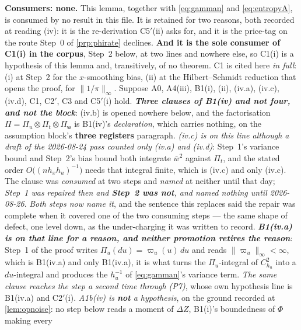 \begin{lemma}\label{lem:aerr}
\textbf{Consumers: none.} This lemma, together with \eqref{eq:gamman} and \eqref{eq:entropyA},
is consumed by no result in this file. It is
retained for two reasons, both recorded at reading (iv): it is the re-derivation C5$'$(ii) asks for,
and it is the price-tag on the route Step~0 of \cref{prp:phirate} declines.
\textbf{And it is the sole consumer of C1(i) in the corpus}, Step~2 below, at two lines and nowhere
else, so C1(i) is a hypothesis of this lemma and, transitively, of no theorem. C1 is
cited here \emph{in full}: (i) at Step~2 for the $x$-smoothing bias, (ii) at the
Hilbert--Schmidt reduction that opens the proof, for $\|1/\pi\|_\infty$.
Suppose A0, A4(iii), B1(i), (ii), (iv.a), (iv.c), (iv.d), C1, C2$'$, C3 and C5$'$(i) hold.
\emph{\textbf{Three clauses of B1(iv) and not four, and not the block}}: \textup{(iv.b)} is opened
nowhere below, and the factorisation $\Pi=\Pi_u\otimes\Pi_t\otimes\Pi_{\mathsf w}$ is B1(iv)'s
\emph{declaration}, which carries nothing, on the assumption block's \textbf{three registers} paragraph.
\emph{\textup{(iv.c)} is on this line although a draft of the 2026-08-24 pass counted only
\textup{(iv.a)} and \textup{(iv.d)}}: Step~1's variance bound and Step~2's bias bound both integrate
$\bar w^{2}$ against $\Pi_t$, and the stated order $O\big((nh_xh_u)^{-1}\big)$ needs that integral
finite, which is \textup{(iv.c)} and only \textup{(iv.c)}. The clause was \emph{consumed} at two steps
and \emph{named} at neither until that day; \emph{Step~1 was repaired then and \textbf{Step~2 was not},
and named nothing until 2026-08-26}. \emph{Both steps now name it}, and the sentence this replaces said
the repair was complete when it covered one of the two consuming steps --- the same shape of defect,
one level down, as the under-charging it was written to record.
\emph{\textbf{B1(iv.a) is on that line for a reason, and neither promotion retires the reason}}: Step~1 of the
proof writes $\Pi_u(du)=\varpi_u(u)\,du$ and reads $\|\varpi_u\|_\infty<\infty$, which is B1(iv.a) and only
B1(iv.a), it is what turns the $\Pi_u$-integral of $C_{h_u}^{2}$ into a $du$-integral and produces the
$h_u^{-1}$ of \eqref{eq:gamman}'s variance term. \emph{The same clause reaches the step a second time
through \textup{(P7)}}, whose own hypothesis line is B1(iv.a) and C2$'$(i).
\emph{A1b(iv) is \textbf{not} a hypothesis}, on the ground recorded at
\cref{lem:opnoise}: no step below reads a moment of $\Delta Z$, B1(i)'s boundedness of $\Phi$ making every

\end{lemma}
